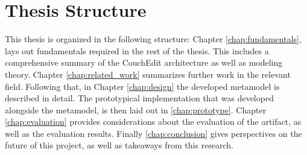 \section{Thesis Structure}
This thesis is organized in the following structure: Chapter \ref{chap:fundamentals}, lays out fundamentals required in the rest of the thesis. This includes a comprehensive summary of the CouchEdit architecture as well as modeling theory. Chapter \ref{chap:related_work} summarizes further work in the relevant field. Following that, in Chapter \ref{chap:design} the developed metamodel is described in detail. The prototypical implementation that was developed alongside the metamodel, is then laid out in \ref{chap:prototype}. Chapter \ref{chap:evaluation} provides considerations about the evaluation of the artifact, as well as the evaluation results. Finally \ref{chap:conclusion} gives perspectives on the future of this project, as well as takeaways from this research.